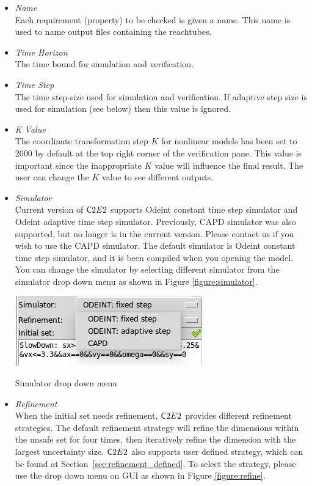 \documentclass{tufte-book} %
\begin{document}
\begin{itemize}
    \item{\em Name}\\ 
    Each requirement (property) to be checked is given a name. This name is used to name output files containing the reachtubes.
    \item{\em Time Horizon}\\
    The time bound for simulation and verification. 
    \item{\em Time Step}\\
    The time step-size used for simulation and verification. If adaptive step size is used for simulation (see below) then this value is ignored.  
    \item{\em K Value}\\
    The coordinate transformation step $K$ for nonlinear models has been set to $2000$ by default at the top right corner of the verification pane. This value is important since the inappropriate $K$ value will influence the final result. The user can change the $K$ value to see different outputs.
    \item {\em Simulator}\\
    Current version of ${{\mathsf C2E2}}$ supports Odeint constant time step simulator and Odeint adaptive time step simulator. Previously, CAPD simulator was also supported, but no longer is in the current version. Please contact us if you wish to use the CAPD simulator. The default simulator is Odeint constant time step simulator, and it is been compiled when you opening the model. You can change the simulator by selecting different simulator from the simulator drop down menu as shown in Figure \ref{figure:simulator}. 

\begin{marginfigure}
\centerline{\includegraphics[scale=.24,keepaspectratio=true]{Figures/simulator.png}}
 \caption{Simulator drop down menu} 
 \label{figure:simulator}
\end{marginfigure}

    \item {\em Refinement}\\
    When the initial set needs refinement, ${{\mathsf C2E2}}$ provides different refinement strategies. The default refinement strategy will refine the dimensions within the unsafe set for four times, then iteratively refine the dimension with the largest uncertainty size. ${{\mathsf C2E2}}$ also supports user defined strategy, which can be found at Section~\ref{sec:refinement_defined}. To select the strategy, please use the drop down menu on GUI as shown in Figure \ref{figure:refine}.


\end{itemize}
\end{document}

